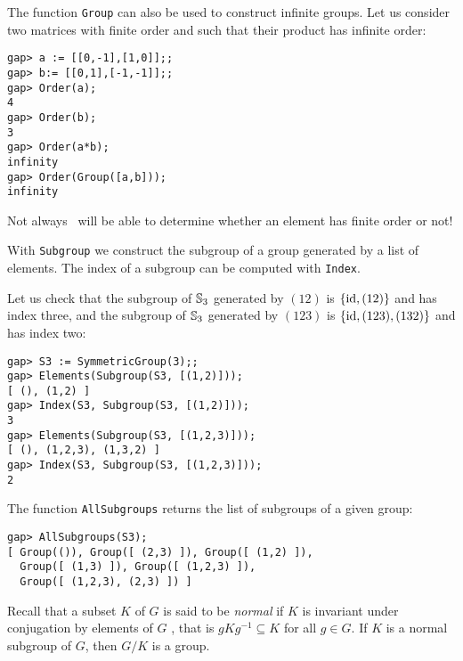 \begin{example}
The function \lstinline{Group} can also be used to construct infinite groups. 
Let us consider two matrices with finite order and such that their product has infinite order:
\begin{lstlisting}
gap> a := [[0,-1],[1,0]];;
gap> b:= [[0,1],[-1,-1]];;
gap> Order(a);
4
gap> Order(b);
3
gap> Order(a*b);
infinity
gap> Order(Group([a,b]));
infinity
\end{lstlisting}
\end{example}

\begin{remark}
	Not always \GAP~will be able to determine whether an element has finite
	order or not! 
\end{remark}

With \lstinline{Subgroup} we construct the subgroup of a group generated by a
list of elements. The index of a subgroup can be computed with
\lstinline{Index}.

\begin{example}
Let us check that the subgroup of
$\mathbb{S}_3$
generated by $(12)$ is
$\{\operatorname{id},(12)\}$ and has index three, and the subgroup of $\mathbb{S}_3$ generated by
$(123)$ is $\{\operatorname{id},(123),(132)\}$ and has index two: 
\begin{lstlisting}
gap> S3 := SymmetricGroup(3);;
gap> Elements(Subgroup(S3, [(1,2)]));
[ (), (1,2) ]
gap> Index(S3, Subgroup(S3, [(1,2)]));
3
gap> Elements(Subgroup(S3, [(1,2,3)]));
[ (), (1,2,3), (1,3,2) ]
gap> Index(S3, Subgroup(S3, [(1,2,3)]));
2
\end{lstlisting}
The function \lstinline{AllSubgroups} returns the list of
subgroups of a given group:
\begin{lstlisting}
gap> AllSubgroups(S3);
[ Group(()), Group([ (2,3) ]), Group([ (1,2) ]),
  Group([ (1,3) ]), Group([ (1,2,3) ]),
  Group([ (1,2,3), (2,3) ]) ]
\end{lstlisting}
\end{example}

Recall that a subset $K$ of $G$ is said to be \emph{normal} if $K$
is invariant under conjugation by elements of $G$ , that is $gKg^{-1}\subseteq K$ for all $g\in G$. If $K$ is a normal subgroup of $G$, then $G/K$ is a group.

